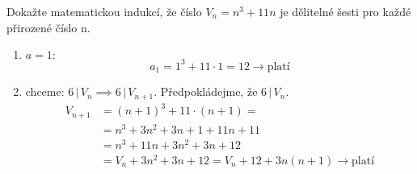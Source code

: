 \begin{example}[SÚM 241/9]
  Dokažte matematickou indukcí, že číslo $V_n = n^3 + 11n$ je dělitelné šesti pro každé přirozené číslo n.
  \begin{enumerate}[$i.$]
    \item $a = 1:$
    $$a_1 = 1^3 + 11\cdot1 = 12 \rightarrow \textrm{platí}$$
    \item chceme: $6\, | \, V_n \implies 6 \, | \, V_{n+1}$. Předpokládejme, že $6\, | \, V_n$.
    \begin{align*}
      V_{n+1} & = (n+1)^3 + 11\cdot(n+1) = \\
      & = n^3 + 3n^2 + 3n + 1 + 11n + 11\\
      &= n^3 + 11n + 3n^2 + 3n + 12\\
      &= V_n + 3n^2 + 3n + 12 = V_n + 12+ 3n(n+1) \rightarrow \textrm{platí}
    \end{align*}
\end{enumerate}
\end{example}


